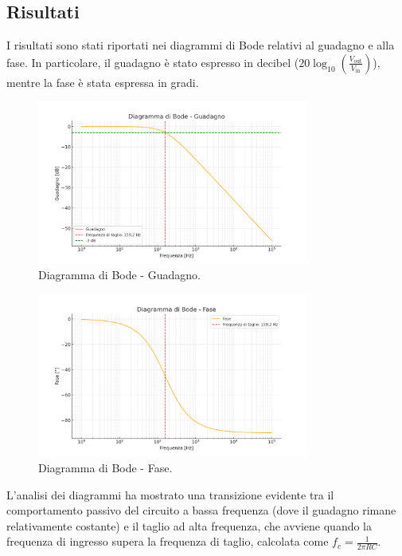 \documentclass[a4paper,10pt]{article}
\begin{document}
\subsection{Risultati}
I risultati sono stati riportati nei diagrammi di Bode relativi al guadagno e alla fase. In particolare, il guadagno è stato espresso in decibel (\(20 \log_{10} \left( \frac{V_{\text{out}}}{V_{\text{in}}} \right)\)), mentre la fase è stata espressa in gradi.

\begin{figure}[H]
\centering
\includegraphics[width=0.8\textwidth]{assets/bode_gain.png}
\caption{Diagramma di Bode - Guadagno.}
\end{figure}

\begin{figure}[H]
\centering
\includegraphics[width=0.8\textwidth]{assets/bode_phase.png}
\caption{Diagramma di Bode - Fase.}
\end{figure}

L'analisi dei diagrammi ha mostrato una transizione evidente tra il comportamento passivo del circuito a bassa frequenza (dove il guadagno rimane relativamente costante) e il taglio ad alta frequenza, che avviene quando la frequenza di ingresso supera la frequenza di taglio, calcolata come \( f_c = \frac{1}{2 \pi RC} \).
\end{document}
